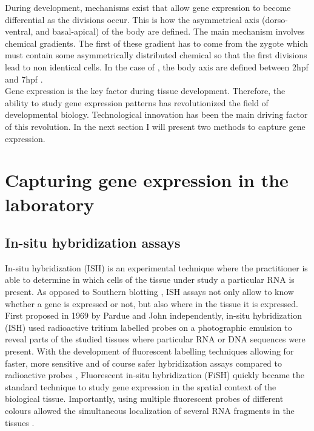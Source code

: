 	During development, mechanisms exist that allow gene expression to become differential as the divisions occur. This is how the asymmetrical axis (dorso-ventral, and basal-apical) of the body are defined. The main mechanism involves chemical gradients. The first of these gradient has to come from the zygote which must contain some asymmetrically distributed chemical so that the first divisions lead to non identical cells. In the case of \platyfull{}, the body axis are defined  between 2hpf and 7hpf \cite{Fischer10}.\\
	
	Gene expression is the key factor during tissue development. Therefore, the ability to study gene expression patterns has revolutionized the field of developmental biology. Technological innovation has been the main driving factor of this revolution. In the next section I will present two methods to capture gene expression.


\section{Capturing gene expression in the laboratory}\label{sec:gene_expression_lab}
     \subsection{In-situ hybridization assays}
     In-situ hybridization (ISH) is an experimental technique where the practitioner is able to determine in which cells of the tissue under study a particular RNA is present. As opposed to Southern blotting \cite{southern75}, ISH assays not only allow to know whether a gene is expressed or not, but also where in the tissue it is expressed. First proposed in 1969 by Pardue \cite{pardue69} and John \cite{john69} independently, in-situ hybridization (ISH) used radioactive tritium labelled probes on a photographic emulsion to reveal parts of the studied tissues where particular RNA or DNA sequences were present. With the development of fluorescent labelling techniques \cite{landegent84,pinkel88} allowing for faster, more sensitive and of course safer hybridization assays compared to radioactive probes \cite{swiger96}, Fluorescent in-situ hybridization (FiSH) quickly became the standard technique to study gene expression in the spatial context of the biological tissue. Importantly, using multiple fluorescent probes of different colours allowed the simultaneous localization of several RNA fragments in the tissues \cite{nederlof89}.\\
     
